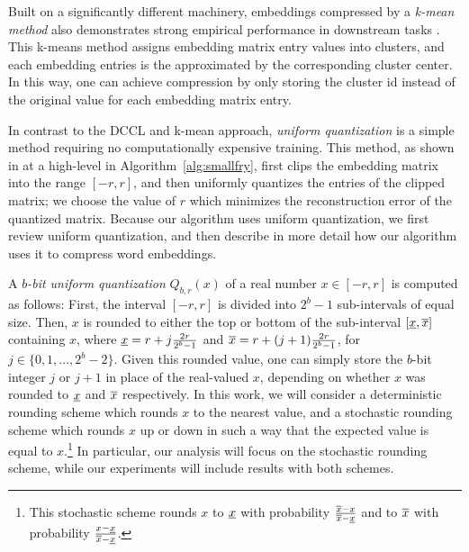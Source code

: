 Built on a significantly different machinery, embeddings compressed by a \emph{k-mean method} also demonstrates strong empirical performance in downstream tasks \citep{andrews16}. This k-means method assigns embedding matrix entry values into clusters, and each embedding entries is the approximated by the corresponding cluster center. In this way, one can achieve compression by only storing the cluster id instead of the original value for each embedding matrix entry. 

In contrast to the DCCL and k-mean approach, \emph{uniform quantization} is a simple method requiring no computationally expensive training. This method, as shown in at a high-level in Algorithm~\ref{alg:smallfry}, first clips the embedding matrix into the range $[-r,r]$, and then uniformly quantizes the entries of the clipped matrix; we choose the value of $r$ which minimizes the reconstruction error of the quantized matrix.
Because our algorithm uses uniform quantization, we first review uniform quantization, and then describe in more detail how our algorithm uses it to compress word embeddings.



A \textit{$b$-bit uniform quantization} $Q_{b,r}(x)$ of a real number $x \in [-r,r]$ is computed as follows:
First, the interval $[-r,r]$ is divided into $2^b - 1$ sub-intervals of equal size.
Then, $x$ is rounded to either the top or bottom of the sub-interval $[\ulx,\olx]$ containing $x$, where $\ulx = r + j\frac{2r}{2^b-1}$ and $\olx = r + (j+1)\frac{2r}{2^b-1}$, for $j\in\{0,1,\ldots,2^b-2\}$.
Given this rounded value, one can simply store the $b$-bit integer $j$ or $j+1$ in place of the real-valued $x$, depending on whether $x$ was rounded to $\ulx$ and $\olx$ respectively.
In this work, we will consider a deterministic rounding scheme which rounds $x$ to the nearest value, and a stochastic rounding scheme which rounds $x$ up or down in such a way that the expected value is equal to $x$.\footnote{
	This stochastic scheme rounds $x$ to $\ulx$ with probability $\frac{\olx-x}{\olx-\ulx}$ and to $\olx$ with probability $\frac{x-\ulx}{\olx-\ulx}$.
}
In particular, our analysis will focus on the stochastic rounding scheme, while our experiments will include results with both schemes.


